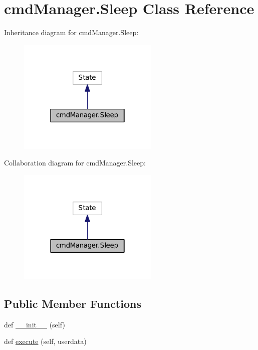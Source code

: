 \hypertarget{classcmdManager_1_1Sleep}{}\section{cmd\+Manager.\+Sleep Class Reference}
\label{classcmdManager_1_1Sleep}


Inheritance diagram for cmd\+Manager.\+Sleep\+:\nopagebreak
\begin{figure}[H]
\begin{center}
\leavevmode
\includegraphics[width=190pt]{classcmdManager_1_1Sleep__inherit__graph}
\end{center}
\end{figure}


Collaboration diagram for cmd\+Manager.\+Sleep\+:\nopagebreak
\begin{figure}[H]
\begin{center}
\leavevmode
\includegraphics[width=190pt]{classcmdManager_1_1Sleep__coll__graph}
\end{center}
\end{figure}
\subsection*{Public Member Functions}
\begin{DoxyCompactItemize}
\item 
def \hyperlink{classcmdManager_1_1Sleep_ad60663dd525a5d09fc4b558d452aa2b3}{\+\_\+\+\_\+init\+\_\+\+\_\+} (self)
\item 
def \hyperlink{classcmdManager_1_1Sleep_a071852b6496ea38cff32c00186ebc0f6}{execute} (self, userdata)
\end{DoxyCompactItemize}
